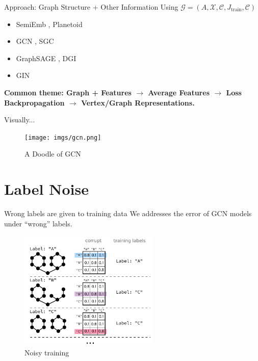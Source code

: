 \documentclass{beamer}
\begin{document}
    \begin{frame}{Approach: Graph Structure + Other Information}
        Using $\mathcal{G} = (A, \mathcal{X}, \mathcal{C}, J_{\text{train}}, \mathcal{C})$
        \vspace{1em}
        \pause
        \begin{itemize}
            \item SemiEmb \cite{semiemb}, Planetoid \cite{planetoid}
            \pause 
            \item GCN \cite{gcn}, SGC \cite{sgc} 
            \pause
            \item GraphSAGE \cite{sage}, DGI \cite{dgi}
            \pause
            \item GIN \cite{gin}
        \end{itemize}
        \pause
        \vspace{1em}
        \bf{Common theme}: Graph + Features \pause$\rightarrow$ Average Features \pause$\rightarrow$ Loss Backpropagation \pause$\rightarrow$ Vertex/Graph Representations.
    \end{frame}

    \begin{frame}{Visually...}
        \begin{figure}
            \centering
            \texttt{[image: imgs/gcn.png]}
            \caption{A Doodle of GCN\cite{gcn}}
            \label{fig:gcn}
        \end{figure}
    \end{frame}

    \section{Label Noise}

    \begin{frame}{Wrong labels are given to training data}
        We addresses the error of GCN models under ``wrong'' labels.
        \begin{figure}
            \centering
            \includegraphics[width=0.6\textwidth]{imgs/scheme}
            \caption{Noisy training}
            \label{fig:sgc}
        \end{figure}
    \end{frame}
\end{document}
